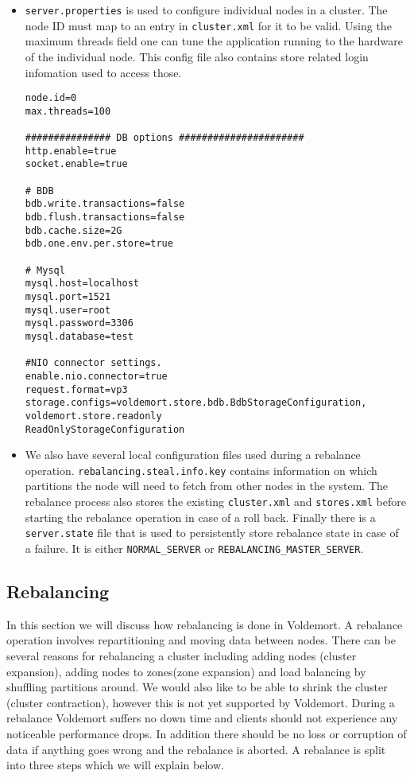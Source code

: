\begin{itemize}
\item \texttt{server.properties} is used to configure individual nodes in a cluster. The node ID must map to an entry in \texttt{cluster.xml} for it to be valid. Using the maximum threads field one can tune the application running to the hardware of the individual node. This config file also contains store related login infomation used to access those. 

\begin{lstlisting}[style=customc, caption=Sample server.properties]
node.id=0
max.threads=100

############### DB options ######################
http.enable=true
socket.enable=true

# BDB
bdb.write.transactions=false
bdb.flush.transactions=false
bdb.cache.size=2G
bdb.one.env.per.store=true

# Mysql
mysql.host=localhost
mysql.port=1521
mysql.user=root
mysql.password=3306
mysql.database=test

#NIO connector settings.
enable.nio.connector=true
request.format=vp3
storage.configs=voldemort.store.bdb.BdbStorageConfiguration, 
voldemort.store.readonly
ReadOnlyStorageConfiguration
\end{lstlisting}

\item We also have several local configuration files used during a rebalance operation. \texttt{rebalancing.steal.info.key} contains information on which partitions the node will need to fetch from other nodes in the system. The rebalance process also stores the existing \texttt{cluster.xml} and \texttt{stores.xml} before starting the rebalance operation in case of a roll back. Finally there is a \texttt{server.state} file that is used to persistently store rebalance state in case of a failure. It is either \texttt{NORMAL\_SERVER} or \texttt{REBALANCING\_MASTER\_SERVER}. 

\end{itemize}

\subsection{Rebalancing}
In this section we will discuss how rebalancing is done in Voldemort. A rebalance operation involves repartitioning and moving data between nodes. There can be several reasons for rebalancing a cluster including adding nodes (cluster expansion), adding nodes to zones(zone expansion) and load balancing by shuffling partitions around. We would also like to be able to shrink the cluster (cluster contraction), however this is not yet supported by Voldemort. During a rebalance Voldemort suffers no down time and clients should not experience any noticeable performance drops. In addition there should be no loss or corruption of data if anything goes wrong and the rebalance is aborted. A rebalance is split into three steps which we will explain below. 

